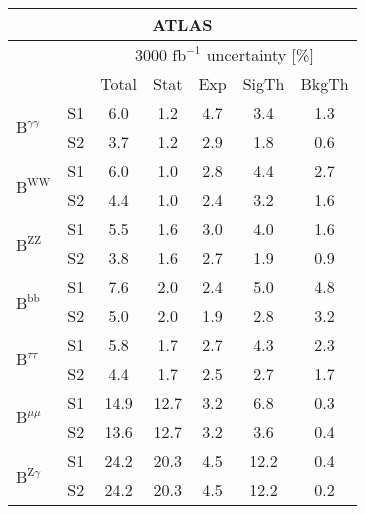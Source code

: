\begin{tabular}{@{} l c c@{\hskip 0.15in} c c c c @{}}
  \hline
   \multicolumn{7}{c}{ATLAS}\\
 \hline  
  &  & \multicolumn{5}{c}{3000 $\text{fb}^{-1}$ uncertainty [\%]} \\
  &  & Total & Stat & Exp & SigTh & BkgTh \\
  \hline
  \multirow{2}{*}{$\mathrm{B}^{\gamma\gamma}$} & S1 &6.0   & 1.2   & 4.7   & 3.4   & 1.3  \\[1pt] 
  & S2  &3.7   & 1.2   & 2.9   & 1.8   & 0.6  \\[4pt]
  \multirow{2}{*}{$\mathrm{B}^{\mathrm{WW}}$} & S1 &6.0   & 1.0   & 2.8   & 4.4   & 2.7  \\[1pt]
  & S2 &4.4   & 1.0   & 2.4   & 3.2   & 1.6  \\[4pt]
  \multirow{2}{*}{$\mathrm{B}^{\mathrm{ZZ}}$} & S1 &5.5   & 1.6   & 3.0   & 4.0   & 1.6  \\[1pt]
  & S2 &3.8   & 1.6   & 2.7   & 1.9   & 0.9  \\[4pt]
  \multirow{2}{*}{$\mathrm{B}^{\mathrm{bb}}$} & S1 &7.6   & 2.0   & 2.4   & 5.0   & 4.8  \\[1pt]
  & S2 &5.0   & 2.0   & 1.9   & 2.8   & 3.2  \\[4pt]
  \multirow{2}{*}{$\mathrm{B}^{\tau\tau }$} & S1 &5.8   & 1.7   & 2.7   & 4.3   & 2.3  \\[1pt]
  & S2 &4.4   & 1.7   & 2.5   & 2.7   & 1.7  \\[4pt]
  \multirow{2}{*}{$\mathrm{B}^{\mu\mu}$} & S1 &14.9  & 12.7  & 3.2   & 6.8   & 0.3  \\[1pt]
  & S2 &13.6  & 12.7  & 3.2   & 3.6   & 0.4  \\[4pt]
  \multirow{2}{*}{$\mathrm{B}^{\mathrm{Z}\gamma}$} & S1 &24.2  & 20.3  & 4.5   & 12.2  & 0.4  \\[1pt]
  & S2 &24.2  & 20.3  & 4.5   & 12.2  & 0.2  \\[4pt]
  \hline
\end{tabular}
